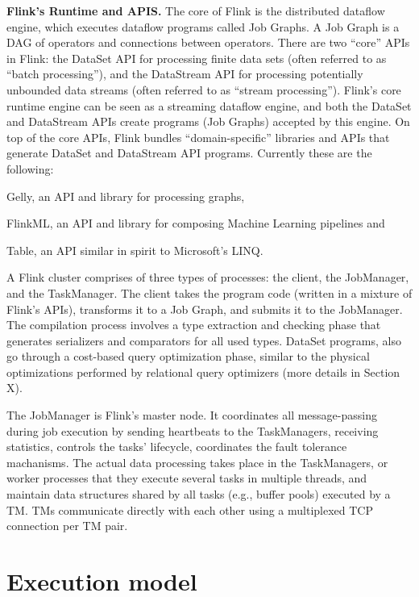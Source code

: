 \documentclass{sig-alternate}
\begin{document}
\textbf{Flink's Runtime and APIS.} The core of Flink is the distributed dataflow engine, which executes dataflow programs called Job Graphs. A Job Graph is a DAG of operators and connections between operators. There are two ``core'' APIs in Flink: the DataSet API for processing finite data sets (often referred to as ``batch processing''), and the DataStream API for processing potentially unbounded data streams (often referred to as ``stream processing''). Flink's core runtime engine can be seen as a streaming dataflow engine, and both the DataSet and DataStream APIs create programs (Job Graphs) accepted by this engine. On top of the core APIs, Flink bundles ``domain-specific'' libraries and APIs that generate DataSet and DataStream API programs. Currently these are the following:
\begin{inparaenum}[i)]
  \item Gelly, an API and library for processing graphs,
  \item FlinkML, an API and library for composing Machine Learning pipelines and
  \item Table, an API similar in spirit to Microsoft's LINQ.
\end{inparaenum}
A Flink cluster comprises of three types of processes: the client, the JobManager, and the TaskManager. The client takes the program code (written in a mixture of Flink's APIs), transforms it to a Job Graph, and submits it to the JobManager. The compilation process involves a type extraction and checking phase that generates serializers and comparators for all used types. DataSet programs, also go through a cost-based query optimization phase, similar to the physical optimizations performed by relational query optimizers (more details in Section X).

The JobManager is Flink's master node. It coordinates all message-passing during job execution by sending heartbeats to the TaskManagers, receiving statistics, controls the tasks' lifecycle,  coordinates the fault tolerance machanisms. The actual data processing takes place in the TaskManagers, or worker processes that they execute several tasks in multiple threads, and maintain data structures shared by all tasks (e.g., buffer pools) executed by a TM. TMs communicate directly with each other using a multiplexed TCP connection per TM pair. 


\section{Execution model}
\end{document}
